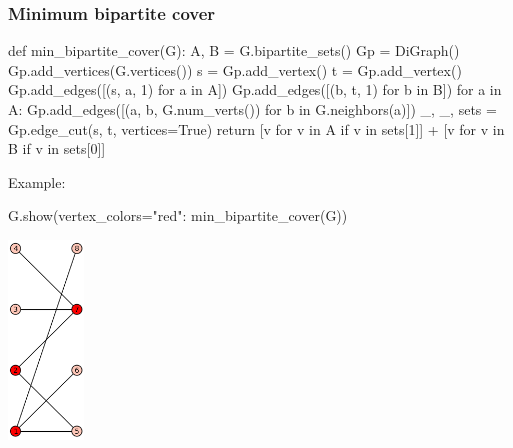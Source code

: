  \subsubsection*{Minimum bipartite cover}

\begin{sageCell}
def min_bipartite_cover(G):
    A, B = G.bipartite_sets()
    Gp = DiGraph()
    Gp.add_vertices(G.vertices())
    s = Gp.add_vertex()
    t = Gp.add_vertex()
    Gp.add_edges([(s, a, 1) for a in A])
    Gp.add_edges([(b, t, 1) for b in B])
    for a in A:
        Gp.add_edges([(a, b, G.num_verts()) for b in G.neighbors(a)])
    _, _, sets = Gp.edge_cut(s, t, vertices=True)
    return [v for v in A if v in sets[1]] + [v for v in B if v in sets[0]]
\end{sageCell}
Example:
\begin{sageCell}
    G.show(vertex_colors={"red": min_bipartite_cover(G)})
\end{sageCell}
\begin{outImage}
    \includegraphics[width=0.15\textwidth]{Images/BipartiteMatchings/bipartite_graph_cover.png}
\end{outImage}


